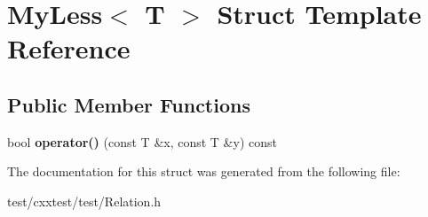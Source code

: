 \hypertarget{structMyLess}{\section{My\-Less$<$ T $>$ Struct Template Reference}
\label{structMyLess}
}
\subsection*{Public Member Functions}
\begin{DoxyCompactItemize}
\item 
\hypertarget{structMyLess_a360fac785cb2a2121fa2e51d1fe561cc}{bool {\bfseries operator()} (const T \&x, const T \&y) const }\label{structMyLess_a360fac785cb2a2121fa2e51d1fe561cc}

\end{DoxyCompactItemize}


The documentation for this struct was generated from the following file\-:\begin{DoxyCompactItemize}
\item 
test/cxxtest/test/Relation.\-h\end{DoxyCompactItemize}
